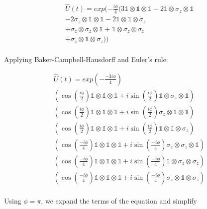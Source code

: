 \begin{multline}
\hat{U} (t) = exp(-\frac{i \phi}{4}( 
3 \mathbb{1} \otimes \mathbb{1} \otimes \mathbb{1}
- 2 \mathbb{1} \otimes \sigma_{z} \otimes \mathbb{1} \\
- 2 \sigma_{z} \otimes \mathbb{1} \otimes \mathbb{1}
- 2 \mathbb{1} \otimes \mathbb{1} \otimes \sigma_{z} \\
+ \sigma_{z} \otimes \sigma_{z} \otimes \mathbb{1}
+ \mathbb{1} \otimes \sigma_{z} \otimes \sigma_{z} \\
+ \sigma_{z} \otimes \mathbb{1} \otimes \sigma_{z}
)) \\
\end{multline}

Applying Baker-Campbell-Hausdorff and Euler's rule:

\begin{multline*}
\hat{U} (t) = exp(-\frac{-3 i \phi}{4}) \\
\left(\cos(\frac{i \phi}{2}) \mathbb{1} \otimes \mathbb{1} \otimes \mathbb{1}
+ i \sin (\frac{i \phi}{2}) \mathbb{1} \otimes \sigma_{z} \otimes \mathbb{1}\right) \\
\left(\cos(\frac{i \phi}{2}) \mathbb{1} \otimes \mathbb{1} \otimes \mathbb{1}
+ i \sin (\frac{i \phi}{2}) \sigma_{z} \otimes \mathbb{1} \otimes \mathbb{1}\right) \\
\left(\cos(\frac{i \phi}{2}) \mathbb{1} \otimes \mathbb{1} \otimes \mathbb{1}
+ i \sin (\frac{i \phi}{2}) \mathbb{1} \otimes \mathbb{1} \otimes \sigma_{z}\right) \\
\left(\cos(\frac{-i \phi}{4}) \mathbb{1} \otimes \mathbb{1} \otimes \mathbb{1}
+ i \sin (\frac{-i \phi}{4}) \sigma_{z} \otimes \sigma_{z} \otimes \mathbb{1}\right) \\
\left(\cos(\frac{-i \phi}{4}) \mathbb{1} \otimes \mathbb{1} \otimes \mathbb{1}
+ i \sin (\frac{-i \phi}{4}) \mathbb{1} \otimes \sigma_{z} \otimes \sigma_{z}\right) \\
\left(\cos(\frac{-i \phi}{4}) \mathbb{1} \otimes \mathbb{1} \otimes \mathbb{1} 
+ i \sin (\frac{-i \phi}{4}) \sigma_{z} \otimes \mathbb{1} \otimes \sigma_{z}\right) \\
\end{multline*}

Using $\phi = \pi$, we expand the terms of the equation and simplify

